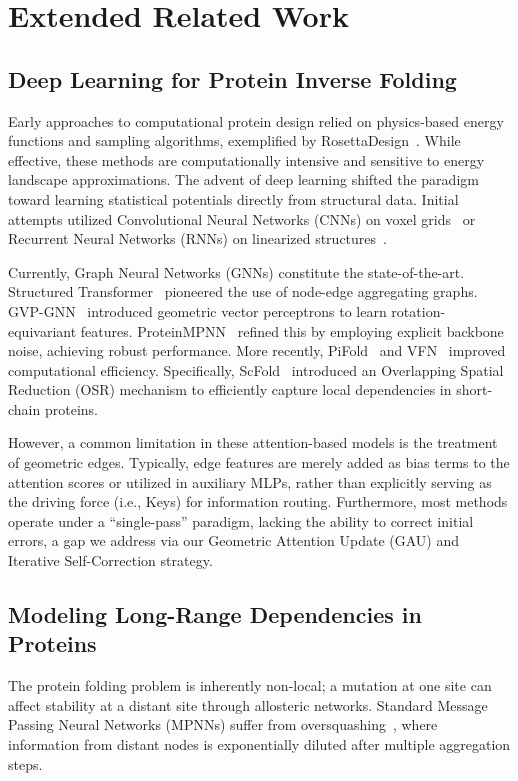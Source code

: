 \documentclass{article}
\theoremstyle{plain}
\theoremstyle{definition}
\theoremstyle{remark}
\begin{document}
{\newpage
\appendix
\onecolumn
\section{Extended Related Work}
\label{sec:appendix_related_work}
\subsection{Deep Learning for Protein Inverse Folding}
Early approaches to computational protein design relied on physics-based energy functions and sampling algorithms, exemplified by RosettaDesign~\cite{leaver2011rosetta3}. While effective, these methods are computationally intensive and sensitive to energy landscape approximations. The advent of deep learning shifted the paradigm toward learning statistical potentials directly from structural data. Initial attempts utilized Convolutional Neural Networks (CNNs) on voxel grids~\cite{anand2022protein} or Recurrent Neural Networks (RNNs) on linearized structures~\cite{bepler2019learning}.

Currently, Graph Neural Networks (GNNs) constitute the state-of-the-art. Structured Transformer~\cite{ingraham2019generative} pioneered the use of node-edge aggregating graphs. GVP-GNN~\cite{jing2020learning} introduced geometric vector perceptrons to learn rotation-equivariant features. ProteinMPNN~\cite{dauparas2022robust} refined this by employing explicit backbone noise, achieving robust performance. More recently, PiFold~\cite{gao2022pifold} and VFN~\cite{mao2023novo} improved computational efficiency. Specifically, ScFold~\cite{zhong2025scfold} introduced an Overlapping Spatial Reduction (OSR) mechanism to efficiently capture local dependencies in short-chain proteins. 

However, a common limitation in these attention-based models is the treatment of geometric edges. Typically, edge features are merely added as bias terms to the attention scores or utilized in auxiliary MLPs, rather than explicitly serving as the driving force (i.e., Keys) for information routing. Furthermore, most methods operate under a ``single-pass'' paradigm, lacking the ability to correct initial errors, a gap we address via our Geometric Attention Update (GAU) and Iterative Self-Correction strategy.

\subsection{Modeling Long-Range Dependencies in Proteins}
The protein folding problem is inherently non-local; a mutation at one site can affect stability at a distant site through allosteric networks. Standard Message Passing Neural Networks (MPNNs) suffer from oversquashing~\cite{alon2020bottleneck}, where information from distant nodes is exponentially diluted after multiple aggregation steps.

}
\end{document}
